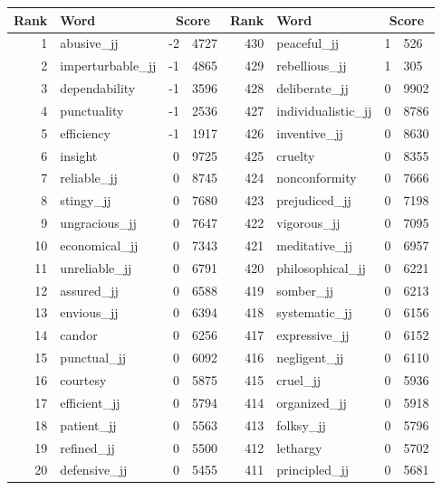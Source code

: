 \begin{table}[tbp]
    \begin{tabular}{| rlr@{.}l | rlr@{.}l |}
    \hline
    \textbf{Rank} & \textbf{Word} & \multicolumn{2}{c|}{\textbf{Score}} & \textbf{Rank} & \textbf{Word} & \multicolumn{2}{c|}{\textbf{Score}} \\
    \hline
    1 & abusive\_jj & -2 & 4727    &    430 & peaceful\_jj & 1 & 526 \\
    2 & imperturbable\_jj & -1 & 4865    &    429 & rebellious\_jj & 1 & 305 \\
    3 & dependability & -1 & 3596    &    428 & deliberate\_jj & 0 & 9902 \\
    4 & punctuality & -1 & 2536    &    427 & individualistic\_jj & 0 & 8786 \\
    5 & efficiency & -1 & 1917    &    426 & inventive\_jj & 0 & 8630 \\
    6 & insight & 0 & 9725    &    425 & cruelty & 0 & 8355 \\
    7 & reliable\_jj & 0 & 8745    &    424 & nonconformity & 0 & 7666 \\
    8 & stingy\_jj & 0 & 7680    &    423 & prejudiced\_jj & 0 & 7198 \\
    9 & ungracious\_jj & 0 & 7647    &    422 & vigorous\_jj & 0 & 7095 \\
    10 & economical\_jj & 0 & 7343    &    421 & meditative\_jj & 0 & 6957 \\
    11 & unreliable\_jj & 0 & 6791    &    420 & philosophical\_jj & 0 & 6221 \\
    12 & assured\_jj & 0 & 6588    &    419 & somber\_jj & 0 & 6213 \\
    13 & envious\_jj & 0 & 6394    &    418 & systematic\_jj & 0 & 6156 \\
    14 & candor & 0 & 6256    &    417 & expressive\_jj & 0 & 6152 \\
    15 & punctual\_jj & 0 & 6092    &    416 & negligent\_jj & 0 & 6110 \\
    16 & courtesy & 0 & 5875    &    415 & cruel\_jj & 0 & 5936 \\
    17 & efficient\_jj & 0 & 5794    &    414 & organized\_jj & 0 & 5918 \\
    18 & patient\_jj & 0 & 5563    &    413 & folksy\_jj & 0 & 5796 \\
    19 & refined\_jj & 0 & 5500    &    412 & lethargy & 0 & 5702 \\
    20 & defensive\_jj & 0 & 5455    &    411 & principled\_jj & 0 & 5681 \\

\end{tabular}
\end{table}
